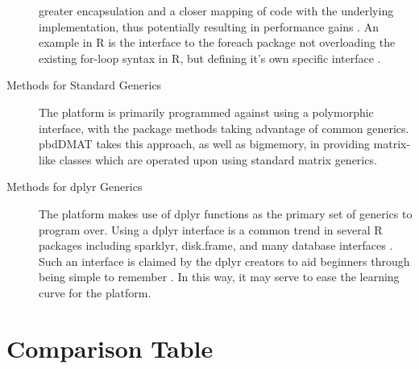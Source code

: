 \documentclass[a4paper,10pt]{article}
\begin{document}
\begin{description}
      greater encapsulation and a closer mapping of code with the
      underlying implementation, thus potentially resulting in
      performance gains \cite{bierhoff2009api}.
      An example in R is the interface to the foreach package not
      overloading the existing for-loop syntax in R, but defining it's
      own specific interface \cite{microsoft20}. 
\item[Methods for Standard Generics]
      The platform is primarily programmed against using a polymorphic
      interface, with the package methods taking advantage of common
      generics.
      pbdDMAT takes this approach, as well as bigmemory, in providing
      matrix-like classes which are operated upon using standard matrix
      generics\cite{pbdDMATpackage}\cite{kane13:bigmemory}.
\item[Methods for dplyr Generics]
      The platform makes use of dplyr functions as the primary set of
      generics to program over.
      Using a dplyr interface is a common trend in several R packages
      including sparklyr, disk.frame, and many database interfaces
      \cite{luraschi20}\cite{zj20}.
      Such an interface is claimed by the dplyr creators to aid
      beginners through being simple to remember \cite{wickham2019welcome}.
      In this way, it may serve to ease the learning curve for the platform.
\end{description}

\section{Comparison Table}\label{sec:comp-tab}
\end{document}
